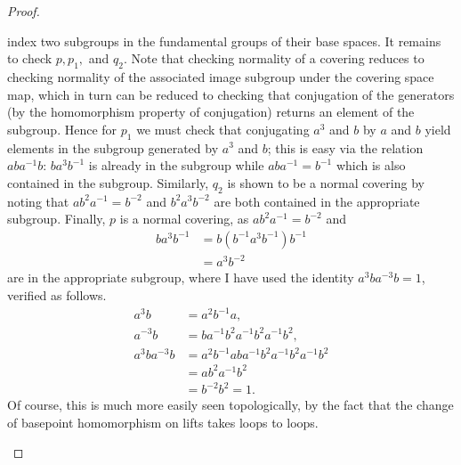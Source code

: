 \documentclass{../mathnotes}
\begin{document}
\begin{proof}
\begin{enumerate}[(a)]
            index two subgroups in the fundamental groups of their base spaces. It remains to check $p,p_1,$ and $q_2$.
            Note that checking normality of a covering reduces to checking normality of the associated
            image subgroup under the covering space map, which in turn can be reduced to checking that conjugation
            of the generators (by the homomorphism property of conjugation) returns an element of the subgroup.
            Hence for $p_1$ we must check that conjugating $a^3$ and $b$ by $a$ and $b$ yield elements in the subgroup
            generated by $a^3$ and $b$; this is easy via the relation $aba^{-1}b$: $ba^3b^{-1}$ is already
            in the subgroup while $aba^{-1}=b^{-1}$ which is also contained in the subgroup.
            Similarly, $q_2$ is shown to be a normal covering by noting that $ab^2a^{-1}=b^{-2}$ and
            $b^2a^3b^{-2}$ are both contained in the appropriate subgroup. Finally, $p$ is a normal covering,
            as $ab^2a^{-1}=b^{-2}$ and
            \begin{align*}
                ba^3b^{-1}&=b(b^{-1}a^{3}b^{-1})b^{-1}\\
                &=a^3b^{-2}
            \end{align*}
            are in the appropriate subgroup, where I have used the identity $a^3ba^{-3}b=1$, verified as follows.
            \begin{align*}
                a^3b&=a^2b^{-1}a,\\
                a^{-3}b&=ba^{-1}b^2a^{-1}b^2a^{-1}b^2,\\
                a^3ba^{-3}b&=a^2b^{-1}aba^{-1}b^2a^{-1}b^2a^{-1}b^2\\
                &=ab^2a^{-1}b^2\\
                &=b^{-2}b^2=1.
            \end{align*}
            Of course, this is much more easily seen topologically, by the fact that the change of basepoint homomorphism
            on lifts takes loops to loops.


\end{enumerate}
\end{proof}
\end{document}

